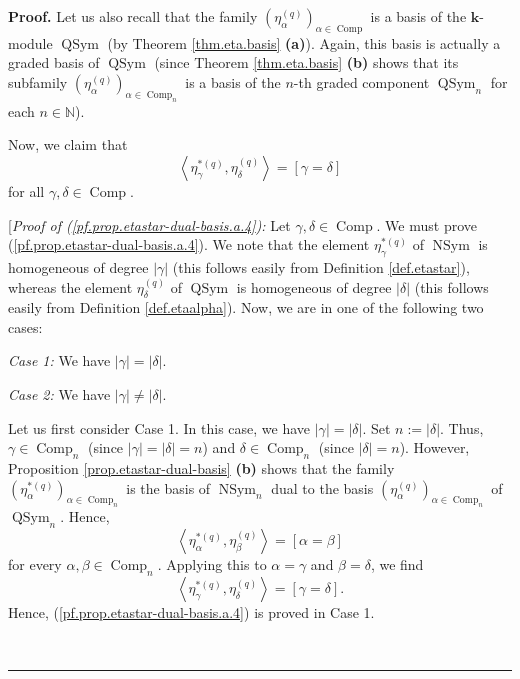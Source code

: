 \documentclass[numbers=enddot,12pt,final,onecolumn,notitlepage]{scrartcl}%
\theoremstyle{definition}
\newenvironment{proof}[1][Proof]{\noindent\textbf{#1.} }{\ \rule{0.5em}{0.5em}}
\newenvironment{verlong}{}{}
\begin{document}
\begin{proof}
\begin{verlong}
Let us also recall that the family $\left(  \eta_{\alpha}^{\left(  q\right)
}\right)  _{\alpha\in\operatorname*{Comp}}$ is a basis of the $\mathbf{k}%
$-module $\operatorname*{QSym}$ (by Theorem \ref{thm.eta.basis} \textbf{(a)}).
Again, this basis is actually a graded basis of $\operatorname*{QSym}$ (since
Theorem \ref{thm.eta.basis} \textbf{(b)} shows that its subfamily $\left(
\eta_{\alpha}^{\left(  q\right)  }\right)  _{\alpha\in\operatorname*{Comp}%
\nolimits_{n}}$ is a basis of the $n$-th graded component
$\operatorname*{QSym}\nolimits_{n}$ for each $n\in\mathbb{N}$).

Now, we claim that%
\begin{equation}
\left\langle \eta_{\gamma}^{\ast\left(  q\right)  },\eta_{\delta}^{\left(
q\right)  }\right\rangle =\left[  \gamma=\delta\right]
\label{pf.prop.etastar-dual-basis.a.4}%
\end{equation}
for all $\gamma,\delta\in\operatorname*{Comp}$.

[\textit{Proof of (\ref{pf.prop.etastar-dual-basis.a.4}):} Let $\gamma
,\delta\in\operatorname*{Comp}$. We must prove
(\ref{pf.prop.etastar-dual-basis.a.4}). We note that the element $\eta
_{\gamma}^{\ast\left(  q\right)  }$ of $\operatorname*{NSym}$ is homogeneous
of degree $\left\vert \gamma\right\vert $ (this follows easily from Definition
\ref{def.etastar}), whereas the element $\eta_{\delta}^{\left(  q\right)  }$
of $\operatorname*{QSym}$ is homogeneous of degree $\left\vert \delta
\right\vert $ (this follows easily from Definition \ref{def.etaalpha}). Now,
we are in one of the following two cases:

\textit{Case 1:} We have $\left\vert \gamma\right\vert =\left\vert
\delta\right\vert $.

\textit{Case 2:} We have $\left\vert \gamma\right\vert \neq\left\vert
\delta\right\vert $.

Let us first consider Case 1. In this case, we have $\left\vert \gamma
\right\vert =\left\vert \delta\right\vert $. Set $n:=\left\vert \delta
\right\vert $. Thus, $\gamma\in\operatorname*{Comp}\nolimits_{n}$ (since
$\left\vert \gamma\right\vert =\left\vert \delta\right\vert =n$) and
$\delta\in\operatorname*{Comp}\nolimits_{n}$ (since $\left\vert \delta
\right\vert =n$). However, Proposition \ref{prop.etastar-dual-basis}
\textbf{(b)} shows that the family $\left(  \eta_{\alpha}^{\ast\left(
q\right)  }\right)  _{\alpha\in\operatorname*{Comp}\nolimits_{n}}$ is the
basis of $\operatorname*{NSym}\nolimits_{n}$ dual to the basis $\left(
\eta_{\alpha}^{\left(  q\right)  }\right)  _{\alpha\in\operatorname*{Comp}%
\nolimits_{n}}$ of $\operatorname*{QSym}\nolimits_{n}$. Hence,
\[
\left\langle \eta_{\alpha}^{\ast\left(  q\right)  },\eta_{\beta}^{\left(
q\right)  }\right\rangle =\left[  \alpha=\beta\right]
\]
for every $\alpha,\beta\in\operatorname*{Comp}\nolimits_{n}$. Applying this to
$\alpha=\gamma$ and $\beta=\delta$, we find%
\[
\left\langle \eta_{\gamma}^{\ast\left(  q\right)  },\eta_{\delta}^{\left(
q\right)  }\right\rangle =\left[  \gamma=\delta\right]  .
\]
Hence, (\ref{pf.prop.etastar-dual-basis.a.4}) is proved in Case 1.


\end{verlong}
\end{proof}
\end{document}
